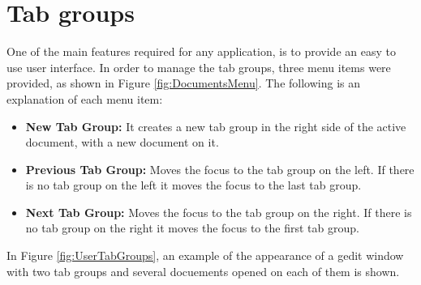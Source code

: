 \chapter{Tab groups}

One of the main features required for any \GNOME application,  is to provide an easy to use user interface. In order to manage the tab groups, 
three menu items were provided, as shown in Figure \ref{fig:DocumentsMenu}. The following is an explanation of each menu item:
\begin{itemize}
  \item \textbf{New Tab Group:} It creates a new tab group in the right side of the active document, with a new document on it.
  \item \textbf{Previous Tab Group:} Moves the focus to the tab group on the left. If there is no tab group on the left it moves the focus to the last tab group.
  \item \textbf{Next Tab Group:} Moves the focus to the tab group on the right. If there is no tab group on the right it moves the focus to the first tab group.
\end{itemize}


In Figure \ref{fig:UserTabGroups}, an example of the appearance of a gedit window with two tab groups and several docuements opened on each of them is shown.

